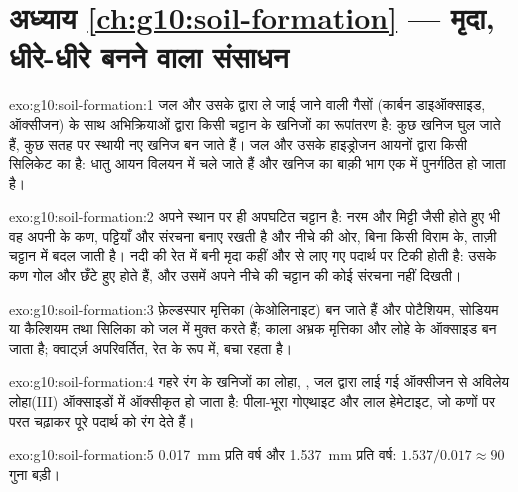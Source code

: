 \section*{अध्याय \ref{ch:g10:soil-formation} --- मृदा, धीरे-धीरे बनने वाला संसाधन}

\begin{solution}{exo:g10:soil-formation:1}
 जल और उसके द्वारा ले जाई जाने वाली गैसों (कार्बन डाइऑक्साइड,
ऑक्सीजन) के साथ अभिक्रियाओं द्वारा किसी चट्टान के खनिजों का रूपांतरण है: कुछ
खनिज घुल जाते हैं, कुछ सतह पर स्थायी नए खनिज बन जाते हैं।
 जल और उसके हाइड्रोजन आयनों द्वारा किसी सिलिकेट का  है:
धातु आयन विलयन में चले जाते हैं और खनिज का बाक़ी भाग
एक  में पुनर्गठित हो जाता है।
\end{solution}

\begin{solution}{exo:g10:soil-formation:2}
 अपने स्थान पर ही अपघटित चट्टान है: नरम और मिट्टी जैसी होते हुए भी वह अपनी
 के कण, पट्टियाँ और संरचना बनाए रखती है और नीचे की ओर, बिना किसी विराम के,
ताज़ी चट्टान में बदल जाती है। नदी की रेत में बनी मृदा कहीं और से लाए गए
पदार्थ पर टिकी होती है: उसके कण गोल और छँटे हुए होते हैं, और उसमें अपने नीचे की
चट्टान की कोई संरचना नहीं दिखती।
\end{solution}

\begin{solution}{exo:g10:soil-formation:3}
फ़ेल्डस्पार मृत्तिका (केओलिनाइट) बन जाते हैं और पोटैशियम, सोडियम या
कैल्शियम तथा सिलिका को जल में मुक्त करते हैं; काला अभ्रक मृत्तिका और लोहे के
ऑक्साइड बन जाता है; क्वार्ट्ज़ अपरिवर्तित, रेत के रूप में, बचा रहता है।
\end{solution}

\begin{solution}{exo:g10:soil-formation:4}
गहरे रंग के खनिजों का लोहा, , जल द्वारा लाई गई ऑक्सीजन से
अविलेय लोहा(III) ऑक्साइडों में ऑक्सीकृत हो जाता है: पीला-भूरा गोएथाइट और लाल
हेमेटाइट, जो कणों पर परत चढ़ाकर पूरे पदार्थ को रंग देते हैं।
\end{solution}

\begin{solution}{exo:g10:soil-formation:5}
\qty{0.017}{mm} प्रति वर्ष और \qty{1.537}{mm} प्रति वर्ष: $1.537/0.017 \approx 90$
गुना बड़ी।
\end{solution}

